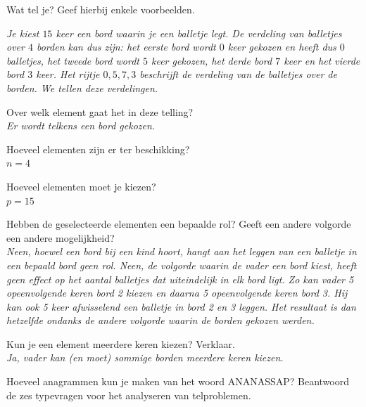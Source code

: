 \begin{werktekstoef}

\item {Wat tel je? Geef hierbij enkele voorbeelden.}

\emph{Je kiest $15$ keer een bord waarin je een balletje legt. De verdeling van balletjes over $4$ borden kan dus zijn: het eerste bord wordt $0$ keer gekozen en heeft dus $0$ balletjes, het tweede bord wordt $5$ keer gekozen, het derde bord $7$ keer en het vierde bord $3$ keer. Het rijtje $0, 5, 7, 3$ beschrijft de verdeling van de balletjes over de borden. We tellen deze verdelingen.}

\item{Over welk element gaat het in deze telling?}\\
\emph{Er wordt telkens een bord gekozen.}

\item{Hoeveel elementen zijn er ter beschikking?} \\
\emph{$n=4$}

\item{Hoeveel elementen moet je kiezen?}\\
\emph{$p=15$}

\item {Hebben de geselecteerde elementen een bepaalde rol? Geeft een andere volgorde een andere mogelijkheid?}\\
\emph{Neen, hoewel een bord bij een kind hoort, hangt aan het leggen van een balletje in een bepaald
bord geen rol. Neen, de volgorde waarin de vader een bord kiest, heeft geen effect op het aantal balletjes dat
uiteindelijk in elk bord ligt. Zo kan vader 5 opeenvolgende keren bord 2 kiezen en daarna 5 opeenvolgende keren bord 3. Hij kan ook 5 keer afwisselend een balletje in bord 2 en 3 leggen. Het resultaat is dan hetzelfde ondanks de andere volgorde waarin de borden gekozen werden.}

\item {Kun je een element meerdere keren kiezen? Verklaar.}\\
\emph{Ja, vader kan (en moet) sommige borden meerdere keren kiezen.}

\end{werktekstoef}


Hoeveel anagrammen kun je maken van het woord ANANASSAP? Beantwoord de zes typevragen voor het analyseren van telproblemen.

